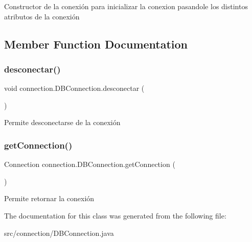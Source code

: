Constructor de la conexión para inicializar la conexion pasandole los distintos atributos de la conexión 

\subsection{Member Function Documentation}
\mbox{\label{classconnection_1_1_d_b_connection_a194f7d7848f479d3779f0c356d2ff6fa}} 
\subsubsection{\texorpdfstring{desconectar()}{desconectar()}}
{\footnotesize\ttfamily void connection.\+D\+B\+Connection.\+desconectar (\begin{DoxyParamCaption}{ }\end{DoxyParamCaption})\hspace{0.3cm}{\ttfamily [inline]}}

Permite desconectarse de la conexión \mbox{\label{classconnection_1_1_d_b_connection_a634bde0075766d2e075830387f970879}} 
\subsubsection{\texorpdfstring{getConnection()}{getConnection()}}
{\footnotesize\ttfamily Connection connection.\+D\+B\+Connection.\+get\+Connection (\begin{DoxyParamCaption}{ }\end{DoxyParamCaption})\hspace{0.3cm}{\ttfamily [inline]}}

Permite retornar la conexión 

The documentation for this class was generated from the following file\+:\begin{DoxyCompactItemize}
\item 
src/connection/D\+B\+Connection.\+java\end{DoxyCompactItemize}
